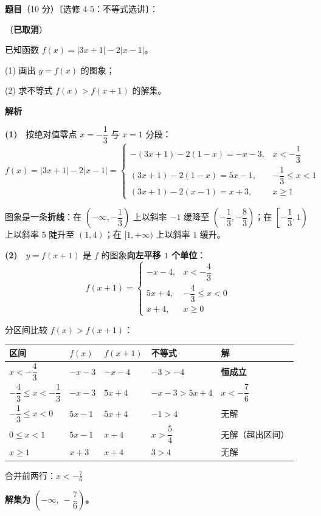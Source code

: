 \begin{answer}

\textbf{题目}（10 分）〔选修 4-5：不等式选讲〕：

（\textbf{已取消}）

已知函数 $f(x)=|3x+1|-2|x-1|$。

  (1) 画出 $y=f(x)$ 的图象；

  (2) 求不等式 $f(x)>f(x+1)$ 的解集。

\par\medskip

\textbf{解析}

\textbf{(1)}　按绝对值零点 $x=-\dfrac13$ 与 $x=1$ 分段：
\nopagebreak[4]
\[f(x)=|3x+1|-2|x-1|=\begin{cases}-(3x+1)-2(1-x)=-x-3,&x<-\dfrac13\\[2mm] (3x+1)-2(1-x)=5x-1,&-\dfrac13\le x<1\\[2mm] (3x+1)-2(x-1)=x+3,&x\ge1\end{cases}\]

图象是一条\textbf{折线}：在 $\left(-\infty,-\dfrac13\right)$ 上以斜率 $-1$ 缓降至 $\left(-\dfrac13,-\dfrac83\right)$；在 $\left[-\dfrac13,1\right)$ 上以斜率 $5$ 陡升至 $(1,4)$；在 $[1,+\infty)$ 上以斜率 $1$ 缓升。

\textbf{(2)}　$y=f(x+1)$ 是 $f$ 的图象\textbf{向左平移 $1$ 个单位}：
\nopagebreak[4]
\[f(x+1)=\begin{cases}-x-4,&x<-\dfrac43\\[2mm] 5x+4,&-\dfrac43\le x<0\\[2mm] x+4,&x\ge0\end{cases}\]

分区间比较 $f(x)>f(x+1)$：

\begin{center}
\begin{tabular}{lllll}
\toprule
区间 & $f(x)$ & $f(x+1)$ & 不等式 & 解 \\
\midrule
$x<-\dfrac43$ & $-x-3$ & $-x-4$ & $-3>-4$ & \textbf{恒成立} \\
$-\dfrac43\le x<-\dfrac13$ & $-x-3$ & $5x+4$ & $-x-3>5x+4$ & $x<-\dfrac76$ \\
$-\dfrac13\le x<0$ & $5x-1$ & $5x+4$ & $-1>4$ & 无解 \\
$0\le x<1$ & $5x-1$ & $x+4$ & $x>\dfrac54$ & 无解（超出区间） \\
$x\ge1$ & $x+3$ & $x+4$ & $3>4$ & 无解 \\
\bottomrule
\end{tabular}
\end{center}

合并前两行：$x<-\frac76$

\textbf{解集为 $\left(-\infty,\ -\dfrac76\right)$。}



\end{answer}